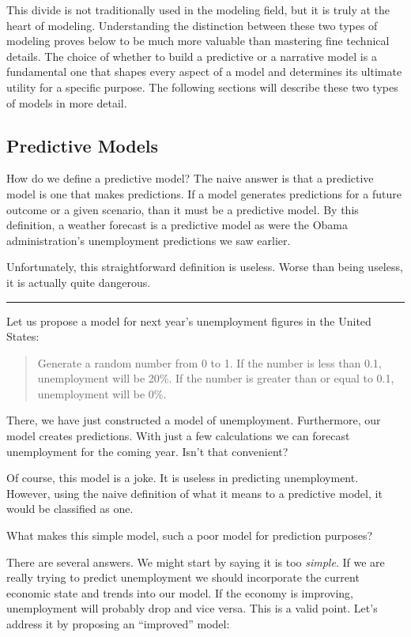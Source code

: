 \documentclass[]{memoir}
\begin{document}
This divide is not traditionally used in the modeling field, but it is
truly at the heart of modeling. Understanding the distinction between
these two types of modeling proves below to be much more valuable than
mastering fine technical details. The choice of whether to build a
predictive or a narrative model is a fundamental one that shapes every
aspect of a model and determines its ultimate utility for a specific
purpose. The following sections will describe these two types of models
in more detail.

\subsection{Predictive Models}

How do we define a predictive model? The naive answer is that a
predictive model is one that makes predictions. If a model generates
predictions for a future outcome or a given scenario, than it must be a
predictive model. By this definition, a weather forecast is a predictive
model as were the Obama administration's unemployment predictions we saw
earlier.

Unfortunately, this straightforward definition is useless. Worse than
being useless, it is actually quite dangerous.

\begin{center}\rule{3in}{0.4pt}\end{center}

Let us propose a model for next year's unemployment figures in the
United States:

\begin{quote}
Generate a random number from 0 to 1. If the number is less than 0.1,
unemployment will be 20\%. If the number is greater than or equal to
0.1, unemployment will be 0\%.
\end{quote}

There, we have just constructed a model of unemployment. Furthermore,
our model creates predictions. With just a few calculations we can
forecast unemployment for the coming year. Isn't that convenient?

Of course, this model is a joke. It is useless in predicting
unemployment. However, using the naive definition of what it means to a
predictive model, it would be classified as one.

What makes this simple model, such a poor model for prediction purposes?

There are several answers. We might start by saying it is too
\emph{simple}. If we are really trying to predict unemployment we should
incorporate the current economic state and trends into our model. If the
economy is improving, unemployment will probably drop and vice versa.
This is a valid point. Let's address it by proposing an ``improved''
model:
\end{document}
